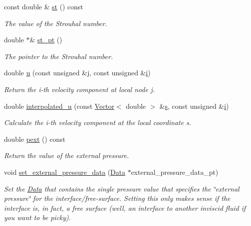 \begin{DoxyCompactItemize}
const double \& \hyperlink{classoomph_1_1FluidInterfaceElement_a0c55c0e3cff597363ecb9ab0869c0015}{st} () const
\begin{DoxyCompactList}\small\item\em The value of the Strouhal number. \end{DoxyCompactList}\item 
double $\ast$\& \hyperlink{classoomph_1_1FluidInterfaceElement_a3fa462bb0ff807cf655ba02b35c1ccb4}{st\+\_\+pt} ()
\begin{DoxyCompactList}\small\item\em The pointer to the Strouhal number. \end{DoxyCompactList}\item 
double \hyperlink{classoomph_1_1FluidInterfaceElement_a50a509413ea7f2a481678837846dd476}{u} (const unsigned \&j, const unsigned \&\hyperlink{cfortran_8h_adb50e893b86b3e55e751a42eab3cba82}{i})
\begin{DoxyCompactList}\small\item\em Return the i-\/th velocity component at local node j. \end{DoxyCompactList}\item 
double \hyperlink{classoomph_1_1FluidInterfaceElement_a8f807a6456da7785b12e45a4c17fb969}{interpolated\+\_\+u} (const \hyperlink{classoomph_1_1Vector}{Vector}$<$ double $>$ \&\hyperlink{cfortran_8h_ab7123126e4885ef647dd9c6e3807a21c}{s}, const unsigned \&\hyperlink{cfortran_8h_adb50e893b86b3e55e751a42eab3cba82}{i})
\begin{DoxyCompactList}\small\item\em Calculate the i-\/th velocity component at the local coordinate s. \end{DoxyCompactList}\item 
double \hyperlink{classoomph_1_1FluidInterfaceElement_a7c0a2a21afce911c301c75febd3ba44c}{pext} () const
\begin{DoxyCompactList}\small\item\em Return the value of the external pressure. \end{DoxyCompactList}\item 
void \hyperlink{classoomph_1_1FluidInterfaceElement_a7230ddea36eb36938d64583e5ee4b15f}{set\+\_\+external\+\_\+pressure\+\_\+data} (\hyperlink{classoomph_1_1Data}{Data} $\ast$external\+\_\+pressure\+\_\+data\+\_\+pt)
\begin{DoxyCompactList}\small\item\em Set the \hyperlink{classoomph_1_1Data}{Data} that contains the single pressure value that specifies the \char`\"{}external pressure\char`\"{} for the interface/free-\/surface. Setting this only makes sense if the interface is, in fact, a free surface (well, an interface to another inviscid fluid if you want to be picky). \end{DoxyCompactList}\item 

\end{DoxyCompactItemize}
